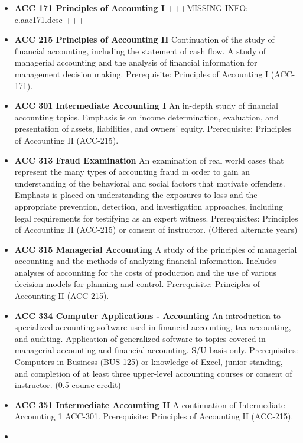 \documentclass[
  letterpaper,
]{scrbook}
\providecommand{\tightlist}{%
  \setlength{\itemsep}{0pt}\setlength{\parskip}{0pt}}
\begin{document}
\begin{itemize}
\tightlist
\item
  \textbf{ACC 171 Principles of Accounting I} +++MISSING INFO:
  c.aac171.desc +++
\item
  \textbf{ACC 215 Principles of Accounting II} Continuation of the study
  of financial accounting, including the statement of cash flow. A study
  of managerial accounting and the analysis of financial information for
  management decision making. Prerequisite: Principles of Accounting I
  (ACC-171).
\item
  \textbf{ACC 301 Intermediate Accounting I} An in-depth study of
  financial accounting topics. Emphasis is on income determination,
  evaluation, and presentation of assets, liabilities, and owners'
  equity. Prerequisite: Principles of Accounting II (ACC-215).
\item
  \textbf{ACC 313 Fraud Examination} An examination of real world cases
  that represent the many types of accounting fraud in order to gain an
  understanding of the behavioral and social factors that motivate
  offenders. Emphasis is placed on understanding the exposures to loss
  and the appropriate prevention, detection, and investigation
  approaches, including legal requirements for testifying as an expert
  witness. Prerequisites: Principles of Accounting II (ACC-215) or
  consent of instructor. (Offered alternate years)
\item
  \textbf{ACC 315 Managerial Accounting} A study of the principles of
  managerial accounting and the methods of analyzing financial
  information. Includes analyses of accounting for the costs of
  production and the use of various decision models for planning and
  control. Prerequisite: Principles of Accounting II (ACC-215).
\item
  \textbf{ACC 334 Computer Applications - Accounting} An introduction to
  specialized accounting software used in financial accounting, tax
  accounting, and auditing. Application of generalized software to
  topics covered in managerial accounting and financial accounting. S/U
  basis only. Prerequisites: Computers in Business (BUS-125) or
  knowledge of Excel, junior standing, and completion of at least three
  upper-level accounting courses or consent of instructor. (0.5 course
  credit)
\item
  \textbf{ACC 351 Intermediate Accounting II} A continuation of
  Intermediate Accounting 1 ACC-301. Prerequisite: Principles of
  Accounting II (ACC-215).
\item

\end{itemize}
\end{document}
